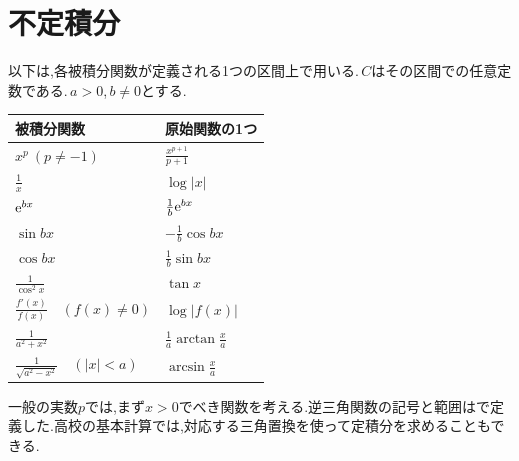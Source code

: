 \section{不定積分}
以下は,各被積分関数が定義される1つの区間上で用いる.\,$C$はその区間での任意定数である.\,$a>0$,\,$b\ne0$とする.
\begin{longtable}{@{}ll@{}}
\toprule
被積分関数 & 原始関数の1つ\\
\midrule
\endhead
$x^p\ (p\ne-1)$ & $\frac{x^{p+1}}{p+1}$\\[4pt]
$\frac1x$ & $\log|x|$\\[4pt]
$\mathrm{e}^{bx}$ & $\frac1b\mathrm{e}^{bx}$\\[4pt]
$\sin bx$ & $-\frac1b\cos bx$\\[4pt]
$\cos bx$ & $\frac1b\sin bx$\\[4pt]
$\frac1{\cos^2x}$ & $\tan x$\\[4pt]
$\frac{f'(x)}{f(x)}\quad(f(x)\ne0)$ & $\log|f(x)|$\\[4pt]
$\frac1{a^2+x^2}$ & $\frac1a\arctan\frac xa$\\[4pt]
$\frac1{\sqrt{a^2-x^2}}\quad(|x|<a)$ & $\arcsin\frac xa$\\[4pt]
\bottomrule
\end{longtable}
一般の実数$p$では,まず$x>0$でべき関数を考える.逆三角関数の記号と範囲はで定義した.高校の基本計算では,対応する三角置換を使って定積分を求めることもできる.


